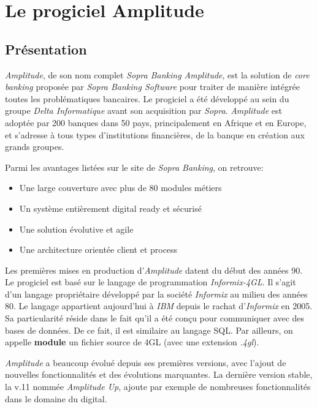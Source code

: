 \documentclass{polytech/polytech}
\begin{document}
\chapter{Le progiciel Amplitude}

\section{Présentation}

\textit{Amplitude}, de son nom complet \textit{Sopra Banking Amplitude}, est la solution de \textit{core banking} proposée par \textit{Sopra Banking Software} pour traiter de manière intégrée toutes les problématiques bancaires. Le progiciel a été développé au sein du groupe \textit{Delta Informatique} avant son acquisition par \textit{Sopra}. \textit{Amplitude} est adoptée par 200 banques dans 50 pays, principalement en Afrique et en Europe, et s’adresse à tous types d’institutions financières, de la banque en création aux grands groupes.

Parmi les avantages listées sur le site de \textit{Sopra Banking}, on retrouve: 

\begin{itemize}
	\item Une large couverture avec plus de 80 modules métiers
	\item Un système entièrement digital ready et sécurisé
	\item Une solution évolutive et agile
	\item Une architecture orientée client et process	
\end{itemize}

Les premières mises en production d'\textit{Amplitude} datent du début des années 90. Le progiciel est basé sur le langage de programmation \textit{Informix-4GL}. Il s'agit d'un langage propriétaire développé par la société \textit{Informix} au milieu des années 80. Le langage appartient aujourd'hui à \textit{IBM} depuis le rachat d'\textit{Informix} en 2005. Sa particularité réside dans le fait qu'il a été conçu pour communiquer avec des bases de données. De ce fait, il est similaire au langage SQL. Par ailleurs, on appelle \textbf{module} un fichier source de 4GL (avec une extension \textit{.4gl}).

\textit{Amplitude} a beaucoup évolué depuis ses premières versions, avec l'ajout de nouvelles fonctionnalités et des évolutions marquantes. La dernière version stable, la v.11 nommée \textit{Amplitude Up}, ajoute par exemple de nombreuses fonctionnalités dans le domaine du digital.
\end{document}
